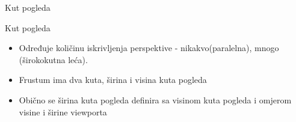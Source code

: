 \documentclass[9pt]{beamer}
\begin{document}
\begin{frame}{Kut pogleda}
	\begin{block}{Kut pogleda}
		\begin{itemize}
			\item Određuje količinu iskrivljenja perspektive - nikakvo(paralelna), mnogo (širokokutna leća).
			\item Frustum ima dva kuta, širina i visina kuta pogleda
			\item Obično se širina kuta pogleda	definira sa visinom kuta pogleda i omjerom visine i širine viewporta
		\end{itemize}
	\end{block}
\end{frame}
\end{document}
